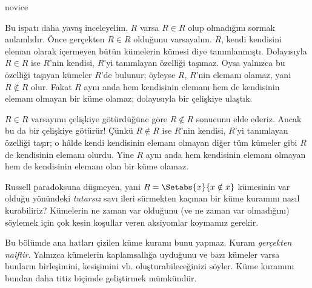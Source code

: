 \begin{tagblock}{novice}
\begin{explain}
Bu ispatı daha yavaş inceleyelim. $R$ varsa $R \in R$ olup olmadığını sormak
anlamlıdır. Önce gerçekten $R \in R$ olduğunu varsayalım. $R$, kendi kendisini
eleman olarak içermeyen bütün kümelerin kümesi diye tanımlanmıştı. Dolayısıyla
$R \in R$ ise $R$'nin kendisi, $R$'yi tanımlayan özelliği taşımaz. Oysa
yalnızca bu özelliği taşıyan kümeler $R$'de bulunur; öyleyse $R$, $R$'nin
elemanı olamaz, yani $R \notin R$ olur. Fakat $R$ aynı anda hem kendisinin elemanı hem de kendisinin
elemanı olmayan bir küme olamaz; dolayısıyla bir çelişkiye ulaştık.

$R \in R$ varsayımı çelişkiye götürdüğüne göre $R \notin R$ sonucunu elde
ederiz. Ancak bu da bir çelişkiye götürür!{} Çünkü $R \notin R$ ise $R$'nin
kendisi, $R$'yi tanımlayan özelliği taşır; o hâlde kendi kendisinin elemanı
olmayan diğer tüm kümeler gibi $R$ de kendisinin elemanı olurdu. Yine $R$
aynı anda hem kendisinin elemanı olmayan hem de kendisinin elemanı olan bir
küme olamaz.
\end{explain}
\end{tagblock}

\begin{digress}
Russell paradoksuna düşmeyen, yani
$R = \Setabs{x}{x \notin x}$ kümesinin var olduğu yönündeki \emph{tutarsız}
savı ileri sürmekten kaçınan bir küme kuramını nasıl kurabiliriz? Kümelerin ne
zaman var olduğunu (ve ne zaman var olmadığını) söylemek için çok kesin
koşullar veren aksiyomlar koymamız gerekir.
	
Bu bölümde ana hatları çizilen küme kuramı bunu yapmaz. Kuram
\emph{gerçekten naiftir}. Yalnızca kümelerin kaplamsallığa uyduğunu ve bazı
kümeler varsa bunların birleşimini, kesişimini vb. oluşturabileceğinizi
söyler. Küme kuramını bundan daha titiz biçimde geliştirmek mümkündür.
\end{digress}


